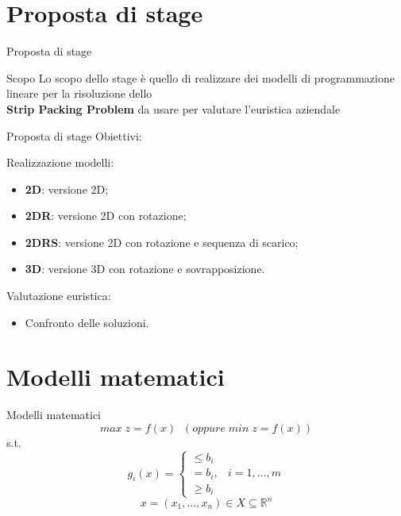 \documentclass{beamer}
\begin{document}
\section{Proposta di stage}

\begin{frame}{Proposta di stage}
	\begin{alertblock}{Scopo}
		Lo scopo dello stage \`e  quello di realizzare dei modelli di programmazione lineare per la risoluzione dello \\ \textbf{Strip Packing Problem} da usare per valutare l'euristica aziendale
	\end{alertblock}
\end{frame}

\begin{frame}{Proposta di stage}
	\large{Obiettivi:}
	\begin{alertblock}{Realizzazione modelli:}
		\begin{itemize}
			\item \textbf{2D}: versione 2D;
			\item \textbf{2DR}: versione 2D con rotazione;
			\item \textbf{2DRS}: versione 2D con rotazione e sequenza di scarico;
			\item \textbf{3D}: versione 3D con rotazione e sovrapposizione.
		\end{itemize}
	\end{alertblock}
	\begin{alertblock}{Valutazione euristica:}
		\begin{itemize}
			\item Confronto delle soluzioni.
		\end{itemize}
	\end{alertblock}
\end{frame}
	
\section{Modelli matematici}
\begin{frame}{Modelli matematici}
		$$ max\; z = f ( x )\;\; (oppure\; min\; z = f ( x ))$$
		s.t.
		$$g_i (x) = \begin{cases} \leq b_i \\ = b_i, & i = 1,\dots,m \\ \geq b_i \end{cases}$$
		$$x = (x_1,\dots,x_n) \in X \subseteq \mathbb{R}^n$$
\end{frame}
\end{document}
